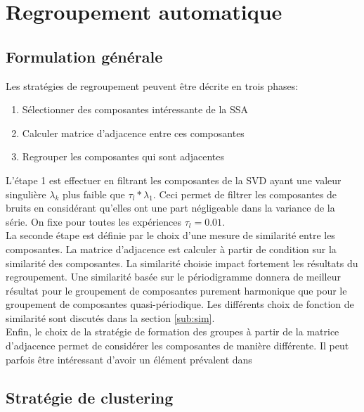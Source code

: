 \documentclass{gretsi}
\begin{document}

\section{Regroupement automatique}

\subsection{Formulation générale}
\label{sub:form}

Les stratégies de regroupement  peuvent être décrite en trois phases:
\begin{enumerate}
	\item Sélectionner des composantes intéressante de la SSA
	\item Calculer matrice d'adjacence entre ces composantes
	\item Regrouper les composantes qui sont adjacentes
\end{enumerate}
L'étape 1 est effectuer en filtrant les composantes de la SVD ayant une valeur singulière $\lambda_k$ plus faible que $\tau_l*\lambda_1$. Ceci permet de filtrer les composantes de bruits en considérant qu'elles ont une part négligeable dans la variance de la série. On fixe pour toutes les expériences $\tau_l = 0.01$.\\

La seconde étape est définie par le choix d'une mesure de similarité entre les composantes. La matrice d'adjacence est calculer à partir de condition sur la similarité des composantes. La similarité choisie impact fortement les résultats du regroupement. Une similarité basée sur le périodigramme donnera de meilleur résultat pour le groupement de composantes purement harmonique que pour le groupement de composantes quasi-périodique. Les différents choix de fonction de similarité sont discutés dans la section \ref{sub:sim}.\\


Enfin, le choix de la stratégie de formation des groupes à partir de la matrice d'adjacence permet de considérer les composantes de manière différente. Il peut parfois être intéressant d'avoir un élément prévalent dans 



\subsection{Stratégie de clustering}
\label{sub:clust}
\end{document}
